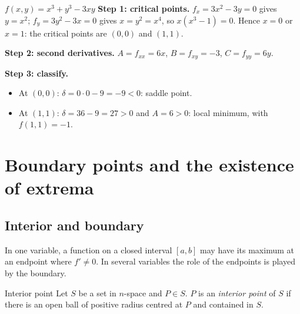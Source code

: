 \begin{example}{$f(x,y)=x^3+y^3-3xy$}
\textbf{Step 1: critical points.} $f_x=3x^2-3y=0$ gives $y=x^2$; $f_y=3y^2-3x=0$ gives
$x=y^2=x^4$, so $x(x^3-1)=0$. Hence $x=0$ or $x=1$: the critical points are $(0,0)$ and $(1,1)$.

\textbf{Step 2: second derivatives.} $A=f_{xx}=6x$, $B=f_{xy}=-3$, $C=f_{yy}=6y$.

\textbf{Step 3: classify.}
\begin{itemize}
  \item At $(0,0)$: $\delta=0\cdot0-9=-9<0$: saddle point.
  \item At $(1,1)$: $\delta=36-9=27>0$ and $A=6>0$: local minimum, with $f(1,1)=-1$.
\end{itemize}
\end{example}

\begin{center}
\end{center}

\section{Boundary points and the existence of extrema}

\subsection{Interior and boundary}

In one variable, a function on a closed interval $[a,b]$ may have its maximum at an endpoint
where $f'\neq0$. In several variables the role of the endpoints is played by the boundary.

\begin{definition}{Interior point}
Let $S$ be a set in $n$-space and $P\in S$. $P$ is an \emph{interior point} of $S$ if there is an
open ball of positive radius centred at $P$ and contained in $S$.
\end{definition}

